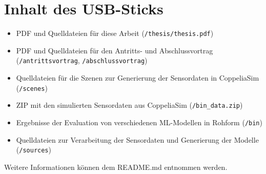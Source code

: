 \chapter{Inhalt des USB-Sticks}
\begin{itemize}
    \item PDF und Quelldateien für diese Arbeit (\texttt{/thesis/thesis.pdf})
    \item PDF und Quelldateien für den Antritts- und Abschlussvortrag (\texttt{/antrittsvortrag}, \texttt{/abschlussvortrag})
    \item Quelldateien für die Szenen zur Generierung der Sensordaten in CoppeliaSim (\texttt{/scenes})
    \item ZIP mit den simulierten Sensordaten aus CoppeliaSim (\texttt{/bin\_data.zip})
    \item Ergebnisse der Evaluation von verschiedenen ML-Modellen in Rohform (\texttt{/bin})
    \item Quelldateien zur Verarbeitung der Sensordaten und Generierung der Modelle (\texttt{/sources})
\end{itemize}
Weitere Informationen können dem README.md entnommen werden.